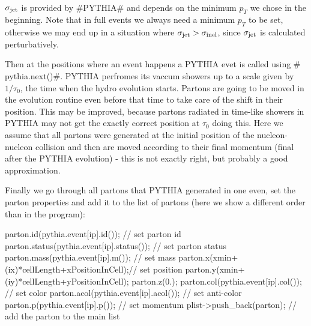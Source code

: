 ~\\
$\sigma_{\rm jet}$ is provided by #PYTHIA# and depends on the minimum $p_T$ we chose
in the beginning. Note that in full events we always need a minimum $p_T$ to be set,
otherwise we may end up in a situation where $\sigma_{\rm jet}>\sigma_{\rm inel}$,
since $\sigma_{\rm jet}$ is calculated perturbatively.

Then at the positions where an event happens a PYTHIA evet is called using
# pythia.next()#. PYTHIA perfromes its vaccum showers up to a scale given by $1/\tau_0$,
the time when the hydro evolution starts.
Partons are going to be moved in the evolution routine even before that time to take care
of the shift in their position. This may be improved, because partons radiated in time-like
showers in PYTHIA may not get the exactly correct position at $\tau_0$ doing this.
Here we assume that all partons were generated at the initial position of the 
nucleon-nucleon collision and then are moved according to their final momentum (final after
the PYTHIA evolution) - this is not exactly right, but probably a good approximation.

Finally we go through all partons that PYTHIA generated in one even,
set the parton properties and add it to the list of partons (here we show a
different order than in the program):\\

\begin{boxedverbatim} 
parton.id(pythia.event[ip].id());              // set parton id
parton.status(pythia.event[ip].status());      // set parton status
parton.mass(pythia.event[ip].m());             // set mass
parton.x(xmin+(ix)*cellLength+xPositionInCell);// set position
parton.y(xmin+(iy)*cellLength+yPositionInCell);
parton.z(0.);
parton.col(pythia.event[ip].col());            // set color 
parton.acol(pythia.event[ip].acol());          // set anti-color
parton.p(pythia.event[ip].p());                // set momentum
plist->push_back(parton);                      // add the parton to the main list
\end{boxedverbatim}\\

~\\



